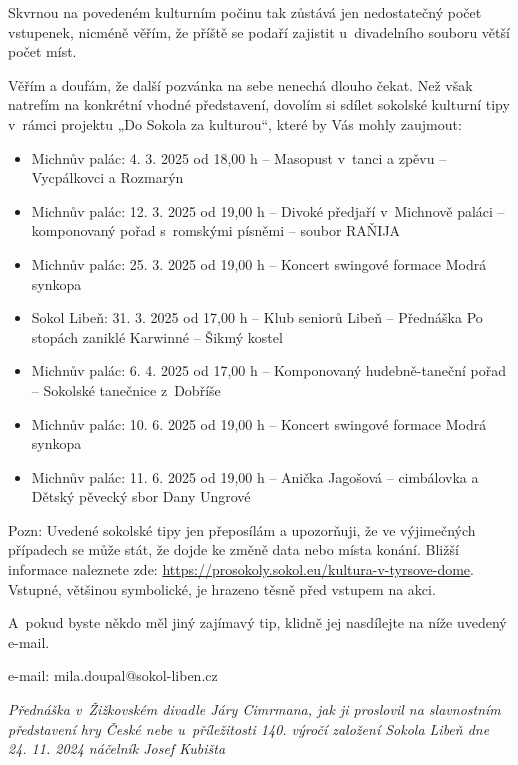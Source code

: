 \documentclass[11pt]{article}
\begin{document}
Skvrnou na povedeném kulturním počinu tak zůstává jen nedostatečný počet vstupenek, nicméně věřím, že příště se podaří zajistit u~divadelního souboru větší počet míst.

Věřím a doufám, že další pozvánka na sebe nenechá dlouho čekat. Než však natrefím na konkrétní vhodné představení, dovolím si sdílet sokolské kulturní tipy v~rámci projektu „Do Sokola za kulturou“, které by Vás mohly zaujmout:

\begin{itemize}[
  itemsep=-3pt,
  leftmargin=1em,
  itemindent=-1em
]
  \item[] Michnův palác: 4. 3. 2025 od 18,00 h – Masopust v~tanci a zpěvu – Vycpálkovci a Rozmarýn
  \item[] Michnův palác: 12. 3. 2025 od 19,00 h – Divoké předjaří v~Michnově paláci – komponovaný pořad s~romskými písněmi – soubor RAŇIJA
  \item[] Michnův palác: 25. 3. 2025 od 19,00 h – Koncert swingové formace Modrá synkopa
  \item[] Sokol Libeň: 31. 3. 2025 od 17,00 h – Klub seniorů Libeň – Přednáška Po stopách zaniklé Karwinné – Šikmý kostel
  \item[] Michnův palác: 6. 4. 2025 od 17,00 h – Komponovaný hudebně-taneční pořad – Sokolské tanečnice z~Dobříše
  \item[] Michnův palác: 10. 6. 2025 od 19,00 h – Koncert swingové formace Modrá synkopa
  \item[] Michnův palác: 11. 6. 2025 od 19,00 h – Anička Jagošová – cimbálovka a Dětský pěvecký sbor Dany Ungrové
\end{itemize}

Pozn: Uvedené sokolské tipy jen přeposílám a upozorňuji, že ve výjimečných případech se může stát, že dojde ke změně data nebo místa konání. Bližší informace naleznete zde: \href{https://prosokoly.sokol.eu/kultura-v-tyrsove-dome}{https://prosokoly.sokol.eu/kultura-v-tyrsove-dome}. Vstupné, většinou symbolické, je hrazeno těsně před vstupem na akci.

A~pokud byste někdo měl jiný zajímavý tip, klidně jej nasdílejte na níže uvedený e-mail.

\signature{Miloslav Doupal}{e-mail: mila.doupal@sokol-liben.cz}
\vspace*{24pt}

\textit{Přednáška v~Žižkovském divadle Járy Cimrmana, jak ji proslovil na slavnostním představení hry České nebe u~příležitosti 140. výročí založení Sokola Libeň dne 24. 11. 2024 náčelník Josef Kubišta}
\end{document}
